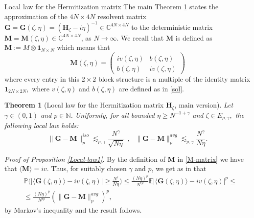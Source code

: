 \documentclass[11pt, a4paper, oneside]{book}
\numberwithin{equation}{chapter}
\newcommand{\E}{\mathbb E}
\newcommand{\beq}{\begin{equation}}
\newcommand{\eeq}{\end{equation}}
\newtheorem{thm}{Theorem}[section]
\begin{document}
\begin{section}{Local law for the Hermitization matrix}
The main Theorem \ref{Local-law2} states the approximation of the $4N \times 4N$ resolvent matrix $\mathbf{G}=\mathbf{G}(\zeta,\eta)=(\mathbf{H}_\zeta - i\eta)^{-1} \in \mathbb{C}^{4N \times 4N}$ to the deterministic matrix $\mathbf{M}=\mathbf{M}(\zeta,\eta)\in \mathbb{C}^{4N \times 4N}$, as $N \to \infty$. We recall that $\mathbf{M}$ is defined as $\mathbf{M} := M \otimes \mathbf{1}_{N \times N}$ which means that
%
\beq \label{M-matrix}
\mathbf{M}(\zeta,\eta) = \begin{pmatrix} iv(\zeta,\eta) & \overline{b(\zeta,\eta)} \\ b(\zeta,\eta) & iv(\zeta,\eta) \end{pmatrix}
\eeq
%
where every entry in this $2 \times 2$ block structure is a multiple of the identity matrix $\mathbf{1}_{2N \times 2N},$ where $v(\zeta,\eta)$ and $b(\zeta,\eta)$ are defined as in \ref{sol}.
%
\pagebreak
%
\begin{thm}[Local law for the Hermitization matrix $\mathbf{H}_\zeta$, main version] \label{Local-law2} Let $\gamma \in (0,1)$ and $p \in \mathbb{N}$. Uniformly, for all bounded $\eta \geq N^{-1+\gamma}$ and $\zeta \in E_{\rho,\gamma},$ the following local law holds:
%
\beq \label{local-law-eq}
\| \mathbf{G} - \mathbf{M} \|_p^{iso} \lesssim_{p , \gamma} \frac{N^\gamma}{\sqrt{N\eta}} \ \ , \ \ \  \| \mathbf{G} - \mathbf{M} \|_p^{avg} \lesssim_{p,\gamma} \frac{N^\gamma}{N\eta} .
\eeq
\end{thm}
%
\textit{Proof of Proposition \ref{Local-law1}.} By the definition of $\mathbf{M}$ in \eqref{M-matrix} we have that $\langle \mathbf{M} \rangle = iv.$ Thus, for suitably chosen $\gamma$ and $p$, we get as in \cite{alt2022local} that
%
\begin{align*}
&\mathbb{P} \bigg ( \left | \langle \mathbf{G}(\zeta,\eta) \rangle - iv(\zeta,\eta) \right | \geq \frac{N^\epsilon}{N\eta} \bigg ) \leq \frac{(N\eta)^p}{N^{\epsilon p}} \E \left |  \langle \mathbf{G}(\zeta,\eta) \rangle - iv(\zeta,\eta) \right |^p \leq  \\
&\leq \frac{(N\eta)^p}{N^{\epsilon p}} \left ( \| \mathbf{G} - \mathbf{M} \|_p^{avg} \right )^p ,
\end{align*}
%
by Markov's inequality and the result follows.


\end{section}
\end{document}
